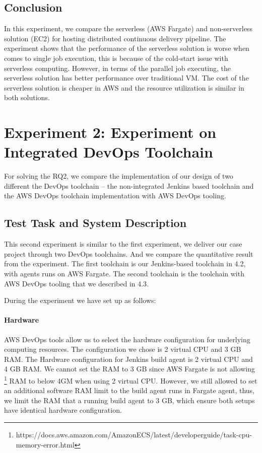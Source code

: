 \subsection{Conclusion}
In this experiment, we compare the serverless (AWS Fargate) and non-serverless solution (EC2) for hosting distributed continuous delivery pipeline. The experiment shows that the performance of the serverless solution is worse when comes to single job execution, this is because of the cold-start issue with serverless computing. However, in terms of the parallel job executing, the serverless solution has better performance over traditional VM. The cost of the serverless solution is cheaper in AWS and the resource utilization is similar in both solutions.
\section{Experiment 2: Experiment on Integrated DevOps Toolchain}
For solving the RQ2, we compare the implementation of our design of two different the DevOps toolchain -- the non-integrated Jenkins based toolchain and the AWS DevOps toolchain implementation with AWS DevOps tooling.
\subsection{Test Task and System Description}
This second experiment is similar to the first experiment, we deliver our case project through two DevOps toolchains. And we compare the quantitative result from the experiment. The first toolchain is our Jenkins-based toolchain in 4.2, with agents runs on AWS Fargate. The second toolchain is the toolchain with AWS DevOps tooling that we described in 4.3.
\par
During the experiment we have set up as follows:
\paragraph{Hardware}
AWS DevOps tools allow us to select the hardware configuration for underlying computing resources. The configuration we chose is 2 virtual CPU and 3 GB RAM.
The Hardware configuration for Jenkins build agent is 2 virtual CPU and 4 GB RAM. We cannot set the RAM to 3 GB since AWS Fargate is not allowing \footnote{https://docs.aws.amazon.com/AmazonECS/latest/developerguide/task-cpu-memory-error.html} RAM to below 4GM when using 2 virtual CPU. However, we still allowed to set an additional software RAM limit to the build agent runs in Fargate agent, thus, we limit the RAM that a running build agent to 3 GB, which ensure both setups have identical hardware configuration.
